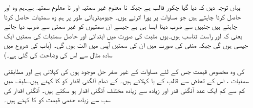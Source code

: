 یہاں توجہ دیں کہ  دیا گیا چکور قالب ہے جبکہ  نا معلوم غیر سمتیہ اور  نا معلوم سمتیہ ہے۔ہم وہ  اور  حاصل کرنا چاہتے ہیں جو مساوات  پر پورا اترتے ہوں۔ جیومیٹریائی طور پر ہم وہ سمتیات  حاصل کرنا چاہتے ہیں جنہیں  سے ضرب دینا ایسا ہی ہے جیسے ان سمتیوں کو غیر سمتی  سے ضرب دیا جائے یعنی کہ  اور  راست تناسب ہوں۔یوں مثبت  کی صورت میں ابتدائی اور حاصل سمتیات کی سمتیں ایک جیسی ہوں گی جبکہ منفی  کی صورت میں ان کی سمتیں آپس میں الٹ ہوں گی۔ (باب کی شروع میں سادہ مثال سے اس کی وضاحت کی گئی ہے۔)

  کی وہ مخصوص قیمت جس کے لئے مساوات  کے غیر صفر  حل موجود ہوں   کی  کہلاتی ہے اور مطابقتی سمتیات ،  اس  کے لحاض سے قالب  کے   یا  کہلاتے ہیں۔ کے تمام آئگنی اقدار کو  کا  کہتے ہیں۔طیف میں کم سے کم ایک عدد آئگنی قدر اور زیادہ سے زیادہ  مختلف آئگنی اقدار ہو سکتے ہیں۔ آئگنی اقدار کی سب سے  زیادہ حتمی قیمت کو  کا  کہتے ہیں۔

